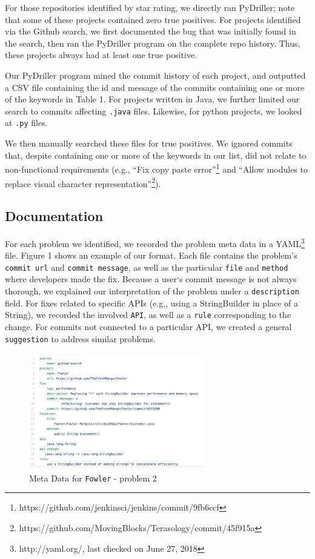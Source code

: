 \documentclass[sigconf]{acmart}
\begin{document}


For those repositories identified by star rating, we directly ran PyDriller; note that some of these projects contained zero true positives. For projects identified via the Github search, we first documented the bug that was initially found in the search, then ran the PyDriller program on the complete repo history. Thus, these projects always had at least one true positive. 

Our PyDriller program mined the commit history of each project, and outputted a CSV file containing the id and message of the commits containing one or more of the keywords in Table 1. For projects written in Java, we further limited our search to commits affecting \texttt{.java} files. Likewise, for python projects, we looked at \texttt{.py} files.

We then manually searched these files for true positives. We ignored commits that, despite containing one or more of the keywords in our list, did not relate to non-functional requirements (e.g., ``Fix copy paste error''\footnote{https://github.com/jenkinsci/jenkins/commit/9fb6ccf} and ``Allow modules to replace visual character representation''\footnote{https://github.com/MovingBlocks/Terasology/commit/45f915a}). 

\subsection{Documentation}
For each problem we identified, we recorded the problem meta data in a YAML\footnote{http://yaml.org/, last checked on June 27, 2018} file. Figure 1 shows an example of our format. Each file contains the problem's \texttt{commit url} and \texttt{commit message}, as well as the particular \texttt{file} and \texttt{method} where developers made the fix. Because a user`s commit message is not always thorough, we explained our interpretation of the problem under a \texttt{description} field. For fixes related to specific APIs (e.g., using a StringBuilder in place of  a String), we recorded the involved \texttt{API}, as well as a \texttt{rule} corresponding to the change. For commits not connected to a particular API, we created a general \texttt{suggestion} to address similar problems.

\begin{figure}
\includegraphics[height=2in, width=3in]{YAMLmetadata}
\caption{Meta Data for \texttt{Fowler} - problem 2}
\end{figure}
\end{document}

